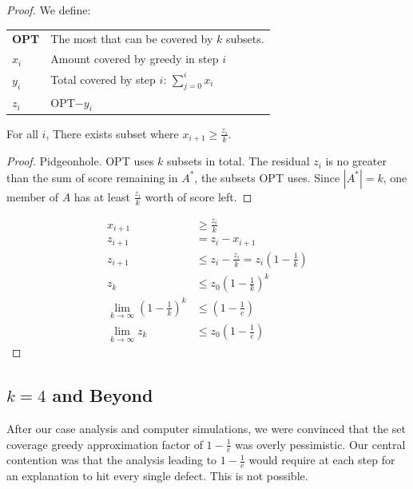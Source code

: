 \documentclass[11pt,twocolumn]{article}
\begin{document}
\begin{proof} We define:

\begin{tabularx}{\linewidth}{l X}
{\bf OPT} & The most that can be covered by $k$ subsets. \\
{\bf $x_i$} & Amount covered by greedy in step $i$ \\
{\bf $y_i$} & Total covered by step $i$: $\sum_{j=0}^i x_i$ \\
{\bf $z_i$} & OPT$-y_i$ \\
\end{tabularx}

\begin{lem} \label{lem:MaxPidgeonhole}
For all $i$,  There exists subset where $x_{i+1} \geq \frac{z_i}{k}$.  
\end{lem}

\begin{proof}
Pidgeonhole.  OPT uses $k$ subsets in total.  The residual $z_i$ is no greater than the sum of score remaining in $A^*$, the subsets OPT uses. Since $ |A^*| = k$, one member of $A$ has at least $ \frac{z_i}{k}$ worth of score left. 
\end{proof}

\begin{eqnarray*}
x_{i+1} &\geq \frac{z_i}{k} \\
z_{i+1} &= z_i - x_{i+1} \\
z_{i+1} &\leq z_i - \frac{z_i}{k} = z_i( 1 - \frac{1}{k} ) \\
z_k    &\leq z_0 ( 1 - \frac{1}{k} )^k \\
\lim_{k \rightarrow \infty} ( 1 - \frac{1}{k} )^k &\leq ( 1 - \frac{1}{e}) \\
\lim_{k \rightarrow \infty} z_k &\leq z_0(1 -  \frac{1}{e}) 
\end{eqnarray*}

\end{proof}

\subsection{$k=4$ and Beyond}

After our case analysis and computer simulations, we were convinced that the set coverage greedy approximation factor of $1-\frac{1}{e}$ was overly pessimistic.  Our central contention was that the analysis leading to $1-\frac{1}{e}$ would require at each step for an explanation to hit every single defect.  This is not possible.
\end{document}

